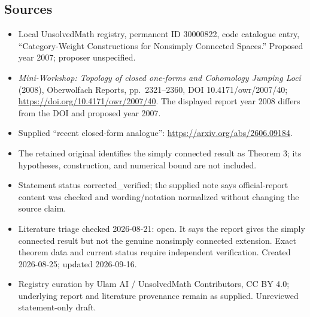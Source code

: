 \documentclass[11pt]{article}
\begin{document}
\subsection{Sources}
\begin{itemize}
\item Local UnsolvedMath registry, permanent ID 30000822, code catalogue entry, ``Category-Weight Constructions for Nonsimply Connected Spaces.'' Proposed year 2007; proposer unspecified.
\item \emph{Mini-Workshop: Topology of closed one-forms and Cohomology Jumping Loci} (2008), Oberwolfach Reports, pp.\ 2321--2360, DOI 10.4171/owr/2007/40; \url{https://doi.org/10.4171/owr/2007/40}. The displayed report year 2008 differs from the DOI and proposed year 2007.
\item Supplied ``recent closed-form analogue'': \url{https://arxiv.org/abs/2606.09184}.
\item The retained original identifies the simply connected result as Theorem 3; its hypotheses, construction, and numerical bound are not included.
\item Statement status corrected\_verified; the supplied note says official-report content was checked and wording/notation normalized without changing the source claim.
\item Literature triage checked 2026-08-21: open. It says the report gives the simply connected result but not the genuine nonsimply connected extension. Exact theorem data and current status require independent verification. Created 2026-08-25; updated 2026-09-16.
\item Registry curation by Ulam AI / UnsolvedMath Contributors, CC BY 4.0; underlying report and literature provenance remain as supplied. Unreviewed statement-only draft.
\end{itemize}
\end{document}
